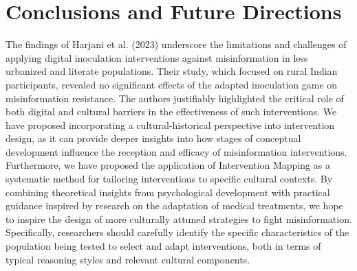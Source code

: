 \documentclass[authordate, reflection, issue]{jote-new-article}
\begin{document}
	\section{Conclusions and Future Directions}



	The findings of Harjani et al. (2023) underscore the limitations and challenges of applying digital inoculation interventions against misinformation in less urbanized and literate populations. Their study, which focused on rural Indian participants, revealed no significant effects of the adapted inoculation game on misinformation resistance. The authors justifiably highlighted the critical role of both digital and cultural barriers in the effectiveness of such interventions. We have proposed incorporating a cultural-historical perspective into intervention design, as it can provide deeper insights into how stages of conceptual development influence the reception and efficacy of misinformation interventions. Furthermore, we have proposed the application of Intervention Mapping as a systematic method for tailoring interventions to specific cultural contexts. By combining theoretical insights from psychological development with practical guidance inspired by research on the adaptation of medical treatments, we hope to inspire the design of more culturally attuned strategies to fight misinformation. Specifically, researchers should carefully identify the specific characteristics of the population being tested to select and adapt interventions, both in terms of typical reasoning styles and relevant cultural components.
\end{document}
